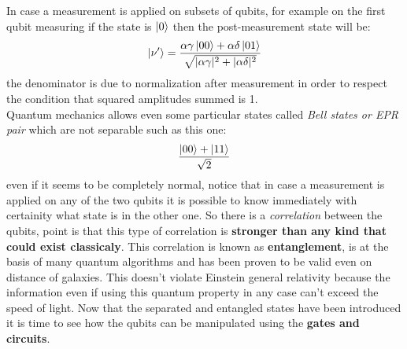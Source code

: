 In case a measurement is applied on subsets of qubits, for example on the first qubit measuring if the state is $\ket{0}$ then the post-measurement state will be:
\begin{equation}\label{post measurement}
		\ket{\nu'} = \frac{\alpha\gamma\ket{00} + \alpha\delta \ket{01}}{\sqrt{|\alpha\gamma|^2 + |\alpha\delta|^2}}
\end{equation}
the denominator is due to normalization after measurement in order to respect the condition that squared amplitudes summed is 1.\\
Quantum mechanics allows even some particular states called \textit{Bell states or EPR pair} which are not separable such as this one:
\begin{equation}\label{bell state}
	\frac{\ket{00} + \ket{11}}{\sqrt{2}}
\end{equation}
even if it seems to be completely normal, notice that in case a measurement is applied on any of the two qubits it is possible to know immediately with certainity what state is in the other one. So there is a \textit{correlation} between the qubits, point is that this type of correlation is \textbf{stronger than any kind that could exist classicaly}. This correlation is known as \textbf{entanglement}, is at the basis of many quantum algorithms and has been proven to be valid even on distance of galaxies. This doesn't violate Einstein general relativity because the information even if using this quantum property in any case can't exceed the speed of light. Now that the separated and entangled states have been introduced it is time to see how the qubits can be manipulated using the \textbf{gates and circuits}.
